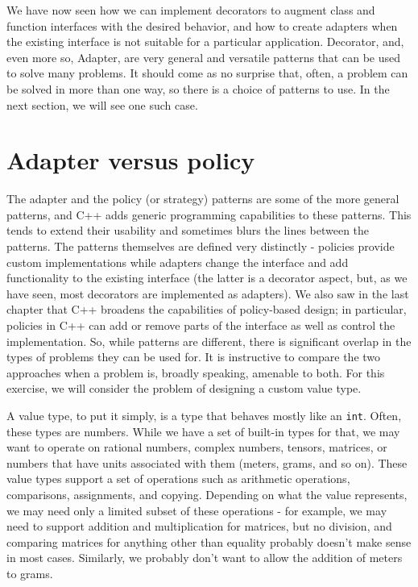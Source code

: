 We have now seen how we can implement decorators to augment class and function interfaces with the desired behavior, and how to create adapters when the existing interface is not suitable for a particular application. Decorator, and, even more so, Adapter, are very general and versatile patterns that can be used to solve many problems. It should come as no surprise that, often, a problem can be solved in more than one way, so there is a choice of patterns to use. In the next section, we will see one such case.

\section{Adapter versus policy}

The adapter and the policy (or strategy) patterns are some of the more general patterns, and C++ adds generic programming capabilities to these patterns. This tends to extend their usability and sometimes blurs the lines between the patterns. The patterns themselves are defined very distinctly - policies provide custom implementations while adapters change the interface and add functionality to the existing interface (the latter is a decorator aspect, but, as we have seen, most decorators are implemented as adapters). We also saw in the last chapter that C++ broadens the capabilities of policy-based design; in particular, policies in C++ can add or remove parts of the interface as well as control the implementation. So, while patterns are different, there is significant overlap in the types of problems they can be used for. It is instructive to compare the two approaches when a problem is, broadly speaking, amenable to both. For this exercise, we will consider the problem of designing a custom value type.

A value type, to put it simply, is a type that behaves mostly like an \texttt{int}. Often, these types are numbers. While we have a set of built-in types for that, we may want to operate on rational numbers, complex numbers, tensors, matrices, or numbers that have units associated with them (meters, grams, and so on). These value types support a set of operations such as arithmetic operations, comparisons, assignments, and copying. Depending on what the value represents, we may need only a limited subset of these operations - for example, we may need to support addition and multiplication for matrices, but no division, and comparing matrices for anything other than equality probably doesn't make sense in most cases. Similarly, we probably don't want to allow the addition of meters to grams.


